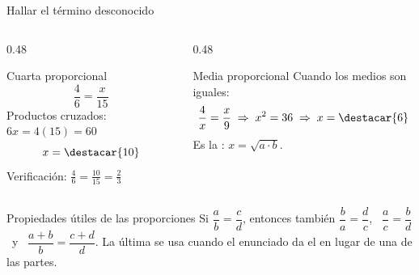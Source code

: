 \documentclass[aspectratio=169,10pt]{beamer}
\begin{document}
\begin{frame}{Hallar el término desconocido}
  \scriptsize
  \begin{columns}[T,onlytextwidth]
    \begin{column}{0.48\textwidth}
      \begin{block}{Cuarta proporcional}
        \tiny
        \[ \frac{4}{6} = \frac{x}{15} \]
        Productos cruzados: $6x = 4(15) = 60$
        \[ x = \destacar{10} \]
        Verificación: $\tfrac{4}{6} = \tfrac{10}{15} = \tfrac{2}{3}$ \checkmark
      \end{block}
    \end{column}
    \begin{column}{0.48\textwidth}
      \begin{block}{Media proporcional}
        \tiny
        Cuando los medios son iguales:
        \[ \frac{4}{x} = \frac{x}{9} \;\Rightarrow\; x^2 = 36
           \;\Rightarrow\; x = \destacar{6} \]
        Es la : $x = \sqrt{a\cdot b}$.
      \end{block}
    \end{column}
  \end{columns}

  \vspace{0.08cm}
  \begin{alertblock}{Propiedades útiles de las proporciones}
    \tiny
    Si $\dfrac{a}{b} = \dfrac{c}{d}$, entonces también
    $\dfrac{b}{a} = \dfrac{d}{c}$, \ $\dfrac{a}{c} = \dfrac{b}{d}$ \ y \
    $\dfrac{a+b}{b} = \dfrac{c+d}{d}$. La última se usa cuando el enunciado da
    el \azul{total} en lugar de una de las partes.
  \end{alertblock}
\end{frame}
\end{document}
